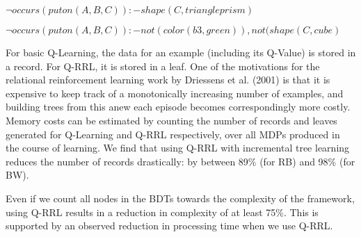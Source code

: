 $\neg occurs(puton(A,B,C)) :- shape(C,triangleprism)$

$\neg occurs(puton(A,B,C)) :- not(color(b3,green)), not(shape(C,cube)$





For basic Q-Learning, the data for an example (including its Q-Value) is stored 
in a record. For Q-RRL, it is stored in a leaf. 
One of the motivations for the relational reinforcement learning work by 
Driessens et al. (2001) is that it is expensive to keep track of a monotonically 
increasing number of examples, and building trees from this anew each episode 
becomes correspondingly more costly.  
Memory costs can be estimated by counting the number of records and leaves 
generated for Q-Learning and Q-RRL respectively, over all MDPs produced in the 
course of learning. 
We find that using Q-RRL with incremental tree learning reduces the number of 
records drastically: by between 89\% (for RB) and 98\% (for BW). 

Even if we count all nodes in the BDTs towards the complexity of the framework, 
using Q-RRL results in a reduction in complexity of at least 75\%.
This is supported by an observed reduction in processing time when we use Q-RRL.



